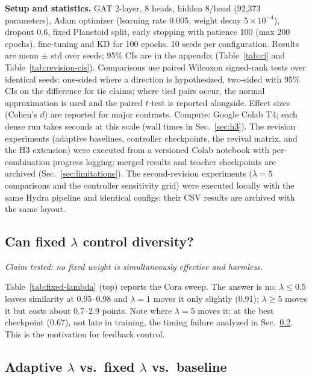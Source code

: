 \documentclass{ws-ijprai}
\begin{document}
\noindent\textbf{Setup and statistics.} GAT 2-layer, 8 heads, hidden 8/head
(92{,}373 parameters), Adam optimizer (learning rate 0.005, weight decay
$5{\times}10^{-4}$), dropout 0.6, fixed Planetoid split, early stopping with
patience 100 (max 200 epochs), fine-tuning and KD for 100 epochs. 10 seeds per
configuration. Results are mean $\pm$ std over seeds; 95\% CIs are in the
appendix (Table~\ref{tab:ci} and Table~\ref{tab:revision-cis}). Comparisons
use paired Wilcoxon signed-rank tests over identical
seeds: one-sided where a direction is hypothesized, two-sided with 95\% CIs
on the difference for tie claims; where tied pairs occur, the normal
approximation is used and the paired $t$-test is reported alongside. Effect
sizes (Cohen's $d$) are reported for major contrasts. Compute: Google Colab
T4; each dense run takes seconds at this scale (wall times in
Sec.~\ref{sec:h3}). The revision experiments (adaptive baselines, controller
checkpoints, the revival matrix, and the H3 extension) were executed from a
versioned Colab notebook with per-combination progress logging; merged
results and teacher checkpoints are archived (Sec.~\ref{sec:limitations}).
The second-revision experiments ($\lambda=5$ comparisons and the controller
sensitivity grid) were executed locally with the same Hydra pipeline and
identical configs; their CSV results are archived with the same layout.

\subsection{Can fixed $\lambda$ control diversity?}
\label{sec:spectrum}

\emph{Claim tested: no fixed weight is simultaneously effective and harmless.}

Table~\ref{tab:fixed-lambda} (top) reports the Cora sweep. The answer is no:
$\lambda \le 0.5$ leaves similarity at 0.95--0.98 and $\lambda=1$ moves it
only slightly (0.91); $\lambda \ge 5$ moves it but costs about 0.7--2.9
points. Note where $\lambda=5$ moves it: at the best
checkpoint (0.67), not late in training, the timing failure analyzed in
Sec.~\ref{sec:h1}. This is the motivation for feedback control.



\subsection{Adaptive $\lambda$ vs.\ fixed $\lambda$ vs.\ baseline}
\label{sec:h1}
\end{document}
